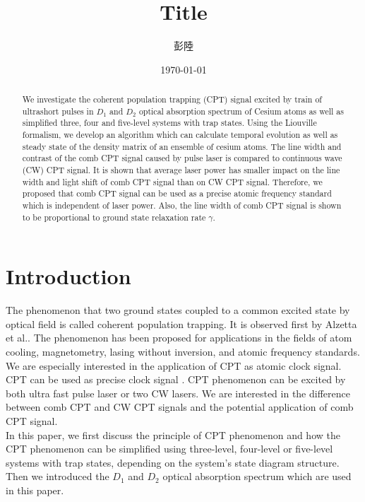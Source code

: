 \documentclass[11pt,a4paper]{article}
\title{Title}
\author{彭陸}
\affil[1]{國立台灣大學物理系}
\date{\today}
\begin{document}
\maketitle
\begin{abstract}
We investigate the coherent population trapping (CPT) signal excited by train of ultrashort pulses in $D_1$ and $D_2$ optical absorption spectrum of Cesium atoms as well as simplified three, four and five-level systems with trap states. Using the Liouville formalism, we develop an algorithm which can calculate temporal evolution as well as steady state of the density matrix of an ensemble of cesium atoms. The line width and contrast of the comb CPT signal caused by pulse laser is compared to continuous wave (CW) CPT signal. It is shown that average laser power has smaller impact on the line width and light shift of comb CPT signal than on CW CPT signal. Therefore, we proposed that comb CPT signal can be used as a precise atomic frequency standard which is independent of laser power. Also, the line width of comb CPT signal is shown to be proportional to ground state relaxation rate $\gamma$.\\
\end{abstract}

\listoftodos
\section{Introduction}
The phenomenon that two ground states coupled to a common excited state by optical field is called coherent population trapping. It is observed first by Alzetta et al.\cite{Alzetta1976}. The phenomenon has been proposed for applications in the fields of atom cooling, magnetometry, lasing without inversion, and atomic frequency standards. We are especially interested in the application of CPT as atomic clock signal. CPT can be used as precise clock signal \cite{Vanier2005}. CPT phenomenon can be excited by both ultra fast pulse laser or two CW lasers. We are interested in the difference between comb CPT and CW CPT signals and the potential application of comb CPT signal.\\

In this paper, we first discuss the principle of CPT phenomenon and how the CPT phenomenon can be simplified using three-level, four-level or five-level systems with trap states, depending on the system's state diagram structure. Then we introduced the $D_1$ and $D_2$ optical absorption spectrum which are used in this paper.\\
\end{document}
